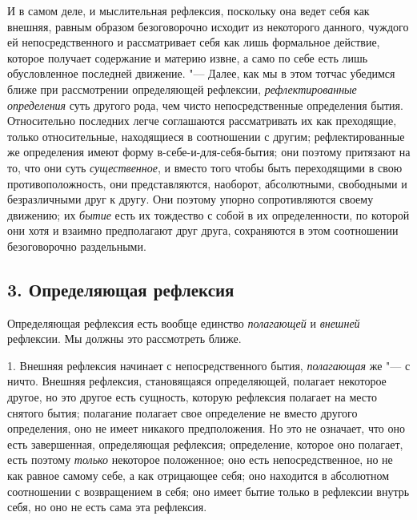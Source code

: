 И в самом деле, и мыслительная рефлексия, поскольку она ведет себя как
внешняя, равным образом безоговорочно исходит из некоторого данного,
чуждого ей непосредственного и рассматривает себя как лишь формальное
действие, которое получает содержание и материю извне, а само по себе есть
лишь обусловленное последней движение. "--- Далее, как мы в этом тотчас
убедимся ближе при рассмотрении определяющей рефлексии,
{\em рефлектированные определения} суть другого рода,
чем чисто непосредственные определения бытия. Относительно последних легче
соглашаются рассматривать их как преходящие, только относительные,
находящиеся в соотношении с другим; рефлектированные же определения имеют
форму в-себе-и-для-себя-бытия; они поэтому притязают на то, что они суть
{\em существенное}, и вместо того чтобы быть
переходящими в свою противоположность, они представляются, наоборот,
абсолютными, свободными и безразличными друг к другу. Они поэтому упорно
сопротивляются своему движению; их {\em бытие} есть их
тождество с собой в их определенности, по которой они хотя и взаимно
предполагают друг друга, сохраняются в этом соотношении безоговорочно
раздельными.

\subsection[3. Определяющая рефлексия]{3. Определяющая рефлексия}
Определяющая рефлексия есть вообще единство
{\em полагающей} и {\em внешней}
рефлексии. Мы должны это рассмотреть ближе.

1. Внешняя рефлексия начинает с непосредственного бытия,
{\em полагающая} же "--- с ничто. Внешняя рефлексия,
становящаяся определяющей, полагает некоторое другое, но это другое есть
сущность, которую рефлексия полагает на место снятого бытия; полагание
полагает свое определение не вместо другого определения, оно не имеет
никакого предположения. Но это не означает, что оно есть завершенная,
определяющая рефлексия; определение, которое оно полагает, есть поэтому
{\em только} некоторое положенное; оно есть
непосредственное, но не как равное самому себе, а как отрицающее себя; оно
находится в абсолютном соотношении с возвращением в себя; оно имеет бытие
только в рефлексии внутрь себя, но оно не есть сама эта рефлексия.

